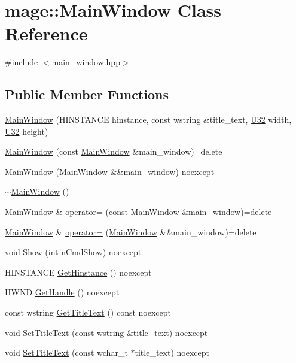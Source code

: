 \hypertarget{classmage_1_1_main_window}{}\section{mage\+:\+:Main\+Window Class Reference}
\label{classmage_1_1_main_window}


{\ttfamily \#include $<$main\+\_\+window.\+hpp$>$}

\subsection*{Public Member Functions}
\begin{DoxyCompactItemize}
\item 
\hyperlink{classmage_1_1_main_window_a007e36554196bc6aa38e9191cdedf587}{Main\+Window} (H\+I\+N\+S\+T\+A\+N\+CE hinstance, const wstring \&title\+\_\+text, \hyperlink{namespacemage_a41c104c036fba3756a74e19f793eeaa1}{U32} width, \hyperlink{namespacemage_a41c104c036fba3756a74e19f793eeaa1}{U32} height)
\item 
\hyperlink{classmage_1_1_main_window_a8dc3c590bb168f8178a7db72ff60fd0c}{Main\+Window} (const \hyperlink{classmage_1_1_main_window}{Main\+Window} \&main\+\_\+window)=delete
\item 
\hyperlink{classmage_1_1_main_window_a6efac47e537a724653125d5114667749}{Main\+Window} (\hyperlink{classmage_1_1_main_window}{Main\+Window} \&\&main\+\_\+window) noexcept
\item 
\hyperlink{classmage_1_1_main_window_ada7ecf97d82ce08ba2f31f0afd891031}{$\sim$\+Main\+Window} ()
\item 
\hyperlink{classmage_1_1_main_window}{Main\+Window} \& \hyperlink{classmage_1_1_main_window_a0c2414ae4e627fb401c045371c286de0}{operator=} (const \hyperlink{classmage_1_1_main_window}{Main\+Window} \&main\+\_\+window)=delete
\item 
\hyperlink{classmage_1_1_main_window}{Main\+Window} \& \hyperlink{classmage_1_1_main_window_a684d547966f69ef5df793b5ce516f76a}{operator=} (\hyperlink{classmage_1_1_main_window}{Main\+Window} \&\&main\+\_\+window)=delete
\item 
void \hyperlink{classmage_1_1_main_window_abbb86e7f4dab1b43ca28f83e265f511e}{Show} (int n\+Cmd\+Show) noexcept
\item 
H\+I\+N\+S\+T\+A\+N\+CE \hyperlink{classmage_1_1_main_window_a1b8c851147ea3b51e645c2fce961fe17}{Get\+Hinstance} () noexcept
\item 
H\+W\+ND \hyperlink{classmage_1_1_main_window_ab4520f7c5ef0828535a117a8512221b5}{Get\+Handle} () noexcept
\item 
const wstring \hyperlink{classmage_1_1_main_window_a16ea3780659e00c8e4732b518c7c4a1e}{Get\+Title\+Text} () const noexcept
\item 
void \hyperlink{classmage_1_1_main_window_aaadd51dc2b902d93ea2f28d685477301}{Set\+Title\+Text} (const wstring \&title\+\_\+text) noexcept
\item 
void \hyperlink{classmage_1_1_main_window_a1baa8554782be197fb5932c3af461f0e}{Set\+Title\+Text} (const wchar\+\_\+t $\ast$title\+\_\+text) noexcept
\end{DoxyCompactItemize}
